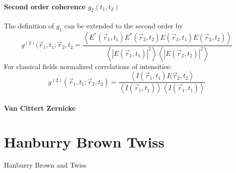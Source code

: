 \paragraph{Second order coherence $g_2(t_1,t_2)$}
The definition of $g_1$ can be extended to the second order by
\begin{equation*}
	g^{(2)}(\vec{r}_1,t_1;\vec{r}_2,t_2= 
	\frac{\left< E^*(\vec{r}_1,t_1)E^*(\vec{r}_2,t_2)E(\vec{r}_1,t_1)E(\vec{r}_2,t_2) \right>}{\left<\left | E(\vec{r}_1,t_1)\right |^2 \right> \left< \left |E(\vec{r}_2,t_2)\right |^2 \right>}	
\end{equation*}
For classical fields normalized correlations of intensities:
\begin{equation}
	g^{(2)}(\vec{r}_1,t_1;\vec{r}_2,t_2)= 
		\frac{\left< I(\vec{r}_1,t_1)I(\vec{r}_2,t_2 \right>}{\left<I(\vec{r}_1,t_1)\right>\left<I(\vec{r}_1,t_1)\right>}	
\end{equation}

\paragraph{Van Cittert Zernicke}

\section{Hanburry Brown Twiss}
Hanburry Brown and Twiss 


